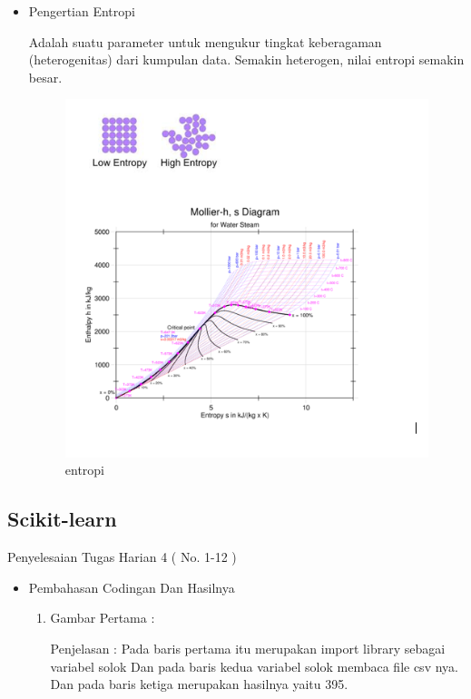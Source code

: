 \begin{enumerate}
\begin{itemize}
\par
\item Pengertian Entropi
\par Adalah suatu parameter untuk mengukur tingkat keberagaman (heterogenitas) dari kumpulan data. Semakin heterogen, nilai entropi semakin besar. 

\par

\begin{figure}[ht]
\centering
\includegraphics[scale=0.5]{figures/gambar10.PNG}
\caption{entropi}
\label{gambar10}
\end{figure}

\par
\end{itemize}

\subsection{Scikit-learn}
Penyelesaian Tugas Harian 4 ( No. 1-12 )
\begin{itemize}
\item Pembahasan Codingan Dan Hasilnya
\begin{enumerate}
\item Gambar Pertama :
\par Penjelasan : Pada baris pertama itu merupakan import library sebagai variabel solok  Dan pada baris kedua variabel solok membaca file csv nya. Dan pada baris ketiga merupakan hasilnya yaitu 395.


\end{enumerate}
\end{itemize}
\end{enumerate}
